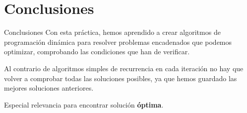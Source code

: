 \documentclass[10pt, xcolor=table]{beamer}
\begin{document}
\section{Conclusiones}

\begin{frame}{Conclusiones}
Con esta práctica, hemos aprendido a crear algoritmos de programación dinámica para resolver problemas encadenados que podemos optimizar, comprobando las condiciones que han de verificar.

Al contrario de algoritmos simples de recurrencia en cada iteración no hay que volver a comprobar todas las soluciones posibles, ya que hemos guardado las mejores soluciones anteriores.

Especial relevancia para encontrar solución \textbf{óptima}.
\end{frame}
\end{document}
